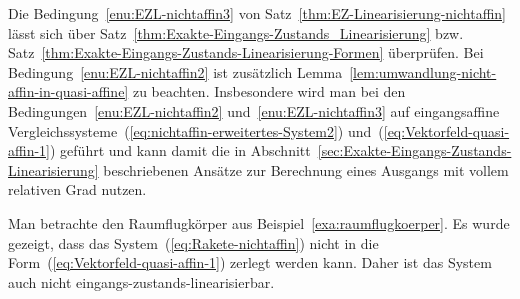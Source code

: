 Die Bedingung~\ref{enu:EZL-nichtaffin3} von Satz~\ref{thm:EZ-Linearisierung-nichtaffin}
lässt sich über Satz~\ref{thm:Exakte-Eingangs-Zustands_Linearisierung}
bzw. Satz~\ref{thm:Exakte-Eingangs-Zustands-Linearisierung-Formen}
überprüfen. Bei Bedingung~\ref{enu:EZL-nichtaffin2} ist zusätzlich
Lemma~\ref{lem:umwandlung-nicht-affin-in-quasi-affine} zu beachten.
Insbesondere wird man bei den Bedingungen~\ref{enu:EZL-nichtaffin2}
und~\ref{enu:EZL-nichtaffin3} auf eingangsaffine Vergleichssysteme~(\ref{eq:nichtaffin-erweitertes-System2})
und~(\ref{eq:Vektorfeld-quasi-affin-1}) geführt und kann damit die
in Abschnitt~\ref{sec:Exakte-Eingangs-Zustands-Linearisierung} beschriebenen
Ansätze zur Berechnung eines Ausgangs mit vollem relativen Grad nutzen.

\begin{example}
Man betrachte den Raumflugkörper aus Beispiel~\ref{exa:raumflugkoerper}.
Es wurde gezeigt, dass das System~(\ref{eq:Rakete-nichtaffin}) nicht
in die Form~(\ref{eq:Vektorfeld-quasi-affin-1}) zerlegt werden kann.
Daher ist das System auch nicht eingangs-zustands-linearisierbar.
\end{example}

